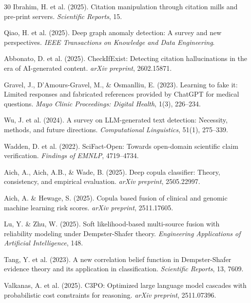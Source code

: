 \documentclass[sigconf,nonacm]{acmart}
\begin{document}
\begin{thebibliography}{30}
Ibrahim, H. et al. (2025).
\newblock Citation manipulation through citation mills and pre-print servers.
\newblock \emph{Scientific Reports}, 15.

Qiao, H. et al. (2025).
\newblock Deep graph anomaly detection: A survey and new perspectives.
\newblock \emph{IEEE Transactions on Knowledge and Data Engineering}.

Abbonato, D. et al. (2025).
\newblock CheckIfExist: Detecting citation hallucinations in the era of AI-generated content.
\newblock \emph{arXiv preprint}, 2602.15871.

Gravel, J., D'Amours-Gravel, M., \& Osmanlliu, E. (2023).
\newblock Learning to fake it: Limited responses and fabricated references provided by ChatGPT for medical questions.
\newblock \emph{Mayo Clinic Proceedings: Digital Health}, 1(3), 226--234.

Wu, J. et al. (2024).
\newblock A survey on LLM-generated text detection: Necessity, methods, and future directions.
\newblock \emph{Computational Linguistics}, 51(1), 275--339.

Wadden, D. et al. (2022).
\newblock SciFact-Open: Towards open-domain scientific claim verification.
\newblock \emph{Findings of EMNLP}, 4719--4734.

Aich, A., Aich, A.B., \& Wade, B. (2025).
\newblock Deep copula classifier: Theory, consistency, and empirical evaluation.
\newblock \emph{arXiv preprint}, 2505.22997.

Aich, A. \& Hewage, S. (2025).
\newblock Copula based fusion of clinical and genomic machine learning risk scores.
\newblock \emph{arXiv preprint}, 2511.17605.

Lu, Y. \& Zhu, W. (2025).
\newblock Soft likelihood-based multi-source fusion with reliability modeling under Dempster-Shafer theory.
\newblock \emph{Engineering Applications of Artificial Intelligence}, 148.

Tang, Y. et al. (2023).
\newblock A new correlation belief function in Dempster-Shafer evidence theory and its application in classification.
\newblock \emph{Scientific Reports}, 13, 7609.

Valkanas, A. et al. (2025).
\newblock C3PO: Optimized large language model cascades with probabilistic cost constraints for reasoning.
\newblock \emph{arXiv preprint}, 2511.07396.


\end{thebibliography}
\end{document}

